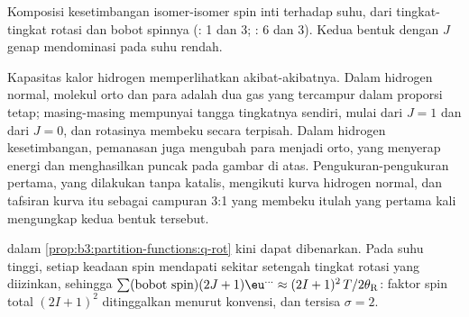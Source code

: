 \begin{omfigure}

{\small Komposisi kesetimbangan isomer-isomer spin inti terhadap suhu, dari
tingkat-tingkat rotasi dan bobot spinnya (: 1 dan 3; : 6 dan 3).
Kedua bentuk dengan $J$ genap mendominasi pada suhu rendah.}
\end{omfigure}

Kapasitas kalor hidrogen memperlihatkan akibat-akibatnya. Dalam hidrogen
normal, molekul orto dan para adalah dua gas yang tercampur dalam proporsi
tetap; masing-masing mempunyai tangga tingkatnya sendiri, mulai dari $J = 1$
dan dari $J = 0$, dan rotasinya membeku secara terpisah. Dalam hidrogen
kesetimbangan, pemanasan juga mengubah para menjadi orto, yang menyerap energi
dan menghasilkan puncak pada gambar di atas. Pengukuran-pengukuran pertama,
yang dilakukan tanpa katalis, mengikuti kurva hidrogen normal, dan tafsiran
kurva itu sebagai campuran 3:1 yang membeku itulah yang pertama kali
mengungkap kedua bentuk tersebut.

\begin{remark}
 dalam \cref{prop:b3:partition-functions:q-rot} kini dapat
dibenarkan. Pada suhu tinggi, setiap keadaan spin mendapati sekitar setengah
tingkat rotasi yang diizinkan, sehingga
$\sum(\text{bobot spin})(2J+1)\eu^{\dots} \approx (2I+1)^2\,T/2\theta_{\mathrm R}$: faktor
spin total $(2I+1)^2$ ditinggalkan menurut konvensi, dan tersisa $\sigma = 2$.
\end{remark}

